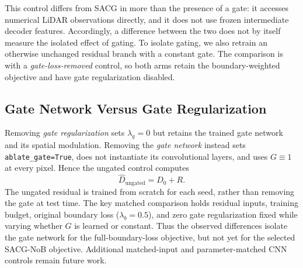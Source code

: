 This control differs from SACG in more than the presence of a gate: it accesses numerical LiDAR observations directly, and it does not use frozen intermediate decoder features. Accordingly, a difference between the two does not by itself measure the isolated effect of gating. To isolate gating, we also retrain an otherwise unchanged residual branch with a constant gate. The comparison is with a \emph{gate-loss-removed} control, so both arms retain the boundary-weighted objective and have gate regularization disabled.

\subsection{Gate Network Versus Gate Regularization}
Removing \emph{gate regularization} sets $\lambda_g=0$ but retains the trained gate network and its spatial modulation. Removing the \emph{gate network} instead sets \texttt{ablate\_gate=True}, does not instantiate its convolutional layers, and uses $G\equiv1$ at every pixel. Hence the ungated control computes
\begin{equation}\widehat D_{\mathrm{ungated}}=D_0+R.\label{eq:ungated}\end{equation}
The ungated residual is trained from scratch for each seed, rather than removing the gate at test time. The key matched comparison holds residual inputs, training budget, original boundary loss ($\lambda_b=0.5$), and zero gate regularization fixed while varying whether $G$ is learned or constant. Thus the observed differences isolate the gate network for the full-boundary-loss objective, but not yet for the selected SACG-NoB objective. Additional matched-input and parameter-matched CNN controls remain future work.

